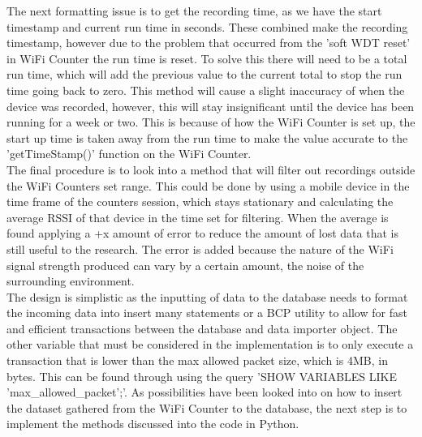 \documentclass{report}
\begin{document}
The next formatting issue is to get the recording time, as we have the start timestamp and current run time in seconds. These combined make the recording timestamp, however due to the problem that occurred from the 'soft WDT reset'\cite{SoftWDTReset} in WiFi Counter the run time is reset. To solve this there will need to be a total run time, which will add the previous value to the current total to stop the run time going back to zero. This method will cause a slight inaccuracy of when the device was recorded, however, this will stay insignificant until the device has been running for a week or two. This is because of how the WiFi Counter is set up, the start up time is taken away from the run time to make the value accurate to the 'getTimeStamp()' function on the WiFi Counter.\\ \newline
The final procedure is to look into a method that will filter out recordings outside the WiFi Counters set range. This could be done by using a mobile device in the time frame of the counters session, which stays stationary and calculating the average RSSI of that device in the time set for filtering. When the average is found applying a +x amount of error to reduce the amount of lost data that is still useful to the research. The error is added because the nature of the WiFi signal strength produced can vary by a certain amount, the noise of the surrounding environment. \\ \newline
The design is simplistic as the inputting of data to the database needs to format the incoming data into insert many statements or a BCP utility to allow for fast and efficient transactions between the database and data importer object. The other variable that must be considered in the implementation is to only execute a transaction that is lower than the max allowed packet size, which is 4MB, in bytes. This can be found through using the query 'SHOW VARIABLES LIKE 'max\_allowed\_packet';'. As possibilities have been looked into on how to insert the dataset gathered from the WiFi Counter to the database, the next step is to implement the methods discussed into the code in Python. \\ \newline
\end{document}

